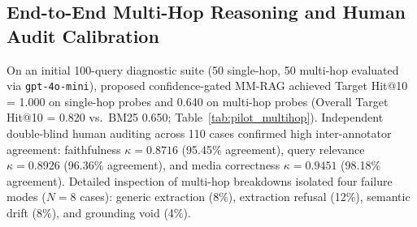 \documentclass[conference]{IEEEtran}
\begin{document}
\subsection{End-to-End Multi-Hop Reasoning and Human Audit Calibration}
On an initial 100-query diagnostic suite (50 single-hop, 50 multi-hop evaluated via \texttt{gpt-4o-mini}), proposed confidence-gated MM-RAG achieved Target Hit@10 = 1.000 on single-hop probes and 0.640 on multi-hop probes (Overall Target Hit@10 = 0.820 vs.\ BM25 0.650; Table~\ref{tab:pilot_multihop}). Independent double-blind human auditing across 110 cases confirmed high inter-annotator agreement: faithfulness $\kappa = 0.8716$ (95.45\% agreement), query relevance $\kappa = 0.8926$ (96.36\% agreement), and media correctness $\kappa = 0.9451$ (98.18\% agreement). Detailed inspection of multi-hop breakdowns isolated four failure modes ($N=8$ cases): generic extraction (8\%), extraction refusal (12\%), semantic drift (8\%), and grounding void (4\%).

\begin{table}[h]
\centering
\small
\caption{Preliminary End-to-End Diagnostic Suite ($N=100$: 50 single-hop, 50 multi-hop queries evaluated via GPT-4o-mini).}
\label{tab:pilot_multihop}
\end{table}
\end{document}
